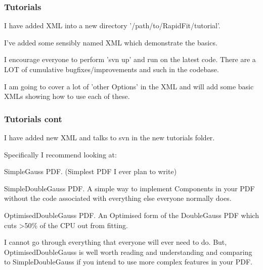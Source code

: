 \documentclass{beamer}
\begin{document}
\begin{frame}
\frametitle{Tutorials}
I have added XML into a new directory '/path/to/RapidFit/tutorial'.\newline

I've added some sensibly named XML which demonstrate the basics.\newline

I encourage everyone to perform 'svn up' and run on the latest code. There are a LOT of cumulative bugfixes/improvements and such in the codebase.\newline

I am going to cover a lot of 'other Options' in the XML and will add some basic XMLs showing how to use each of these.

\end{frame}

\begin{frame}
\frametitle{Tutorials cont}
I have added new XML and talks to svn in the new tutorials folder.\newline

Specifically I recommend looking at:\newline
\scriptsize

SimpleGauss PDF.\newline
(Simplest PDF I ever plan to write)\newline

SimpleDoubleGauss PDF.\newline
A simple way to implement Components in your PDF without the code associated with everything else everyone normally does.\newline

OptimisedDoubleGauss PDF.\newline
An Optimised form of the DoubleGauss PDF which cuts >50\% of the CPU out from fitting.\newline

\normalsize
I cannot go through everything that everyone will ever need to do. But, OptimisedDoubleGauss is well worth reading and understanding and comparing to SimpleDoubleGauss if you intend to use more complex features in your PDF.

\end{frame}
\end{document}
